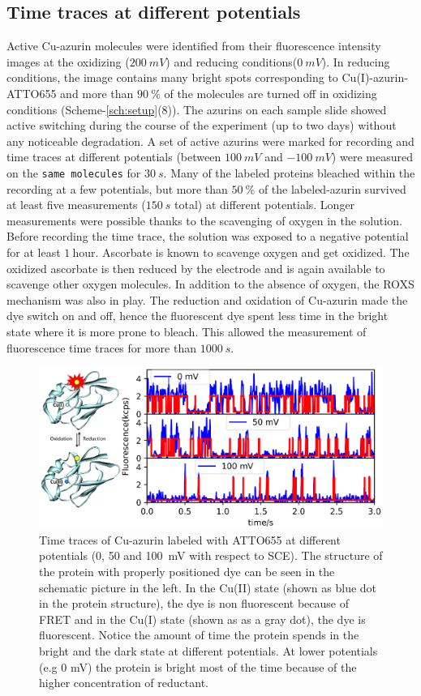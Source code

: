 \documentclass[journal=jacsat,manuscript=article]{achemso}
\begin{document}
\subsection{Time traces at different potentials}
Active Cu-azurin molecules were identified from their fluorescence intensity images at the oxidizing ($200~mV$) and 
reducing conditions($0~mV$). In reducing conditions, the image contains many bright spots corresponding to 
Cu(I)-azurin-ATTO655 and more than $90~\%$ of the molecules are turned off in oxidizing conditions 
(Scheme-\ref{sch:setup}(8)). The azurins on each sample slide showed active switching during the course of the 
experiment (up to two days) without any noticeable degradation. A set of active azurins were marked for recording 
and time traces at different potentials (between $100~mV$ and $-100~mV$) were measured on the \texttt{same molecules} 
for $30~s$. Many of the labeled proteins bleached within the recording at a few potentials, but more than $50~$\% of 
the labeled-azurin survived at least five measurements ($150~s$ total) at different potentials. Longer measurements 
were possible thanks to the scavenging of oxygen in the solution. Before recording the time trace, the solution was 
exposed to a negative potential for at least $1~$hour. Ascorbate is known to  scavenge 
oxygen\cite{dave1997effectiveness} and get oxidized. The oxidized ascorbate is then reduced by the electrode and is 
again available to scavenge other oxygen molecules. In addition to the absence of oxygen, the ROXS mechanism was also 
in play.\cite{cordes2009on} The reduction and oxidation of Cu-azurin made the dye switch on and off, hence the 
fluorescent dye spent less time in the bright state where it is more prone to bleach. This allowed the measurement 
of fluorescence time traces for more than $1000~s$.\\
\begin{figure}
	\centering
	\includegraphics[]{Figure_1_timetrace_CuAzu.eps}
	\caption{Time traces of Cu-azurin labeled with ATTO655 at different potentials (0, 50 and 100~mV with respect 
	to SCE). The structure of the protein with properly positioned dye can be seen in the schematic picture in the 
	left. In the Cu(II) state (shown as blue dot in the protein structure), the dye is non fluorescent because of 
	FRET and in the Cu(I) state (shown as as a gray dot), the dye is fluorescent. Notice the amount of time the 
	protein spends in the bright and the dark state at different potentials. At lower potentials (e.g 0 mV) 
	the protein is bright most of the time because of the higher concentration of reductant.}
	\label{fig:timetrace}
\end{figure}
\end{document}
